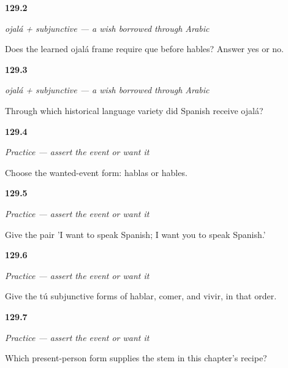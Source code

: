 \noindent\begin{minipage}[t]{\linewidth}
\raggedright
\hypertarget{review-ES-C18-ojala-no-que}{\textbf{129.2}} \emph{ojalá + subjunctive — a wish borrowed through Arabic}\par
\small Does the learned ojalá frame require que before hables? Answer yes or no.
\end{minipage}\par\medskip

\noindent\begin{minipage}[t]{\linewidth}
\raggedright
\hypertarget{review-ES-C18-ojala-source}{\textbf{129.3}} \emph{ojalá + subjunctive — a wish borrowed through Arabic}\par
\small Through which historical language variety did Spanish receive ojalá?
\end{minipage}\par\medskip

\noindent\begin{minipage}[t]{\linewidth}
\raggedright
\hypertarget{review-ES-C18-practice-fact-wanted}{\textbf{129.4}} \emph{Practice — assert the event or want it}\par
\small Choose the wanted-event form: hablas or hables.
\end{minipage}\par\medskip

\noindent\begin{minipage}[t]{\linewidth}
\raggedright
\hypertarget{review-ES-C18-practice-one-two}{\textbf{129.5}} \emph{Practice — assert the event or want it}\par
\small Give the pair 'I want to speak Spanish; I want you to speak Spanish.'
\end{minipage}\par\medskip

\noindent\begin{minipage}[t]{\linewidth}
\raggedright
\hypertarget{review-ES-C18-practice-regular-rows}{\textbf{129.6}} \emph{Practice — assert the event or want it}\par
\small Give the tú subjunctive forms of hablar, comer, and vivir, in that order.
\end{minipage}\par\medskip

\noindent\begin{minipage}[t]{\linewidth}
\raggedright
\hypertarget{review-ES-C18-practice-yo-stem}{\textbf{129.7}} \emph{Practice — assert the event or want it}\par
\small Which present-person form supplies the stem in this chapter's recipe?
\end{minipage}\par\medskip

